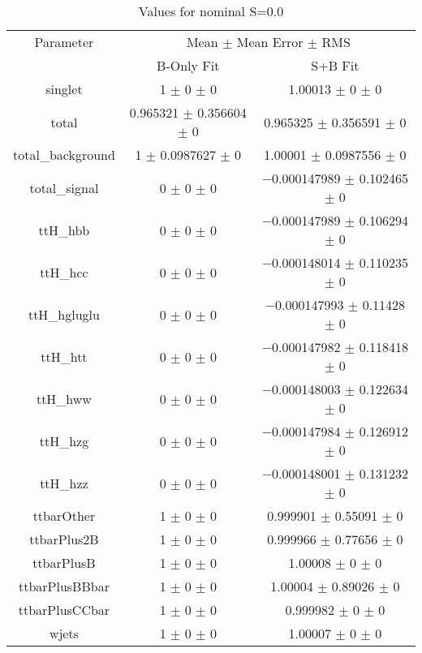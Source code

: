 \begin{table}
\centering
\caption{Values for nominal S=0.0}
\begin{tabular}{ccc}
\toprule
Parameter & \multicolumn{2}{c}{Mean $\pm$ Mean Error $\pm$ RMS}\\
 & B-Only Fit & S+B Fit\\
\midrule
singlet & \num{1} $\pm$ \num{0} $\pm$ \num{0} & \num{1.00013} $\pm$ \num{0} $\pm$ \num{0}\\
total & \num{0.965321} $\pm$ \num{0.356604} $\pm$ \num{0} & \num{0.965325} $\pm$ \num{0.356591} $\pm$ \num{0}\\
total\_background & \num{1} $\pm$ \num{0.0987627} $\pm$ \num{0} & \num{1.00001} $\pm$ \num{0.0987556} $\pm$ \num{0}\\
total\_signal & \num{0} $\pm$ \num{0} $\pm$ \num{0} & \num{-0.000147989} $\pm$ \num{0.102465} $\pm$ \num{0}\\
ttH\_hbb & \num{0} $\pm$ \num{0} $\pm$ \num{0} & \num{-0.000147989} $\pm$ \num{0.106294} $\pm$ \num{0}\\
ttH\_hcc & \num{0} $\pm$ \num{0} $\pm$ \num{0} & \num{-0.000148014} $\pm$ \num{0.110235} $\pm$ \num{0}\\
ttH\_hgluglu & \num{0} $\pm$ \num{0} $\pm$ \num{0} & \num{-0.000147993} $\pm$ \num{0.11428} $\pm$ \num{0}\\
ttH\_htt & \num{0} $\pm$ \num{0} $\pm$ \num{0} & \num{-0.000147982} $\pm$ \num{0.118418} $\pm$ \num{0}\\
ttH\_hww & \num{0} $\pm$ \num{0} $\pm$ \num{0} & \num{-0.000148003} $\pm$ \num{0.122634} $\pm$ \num{0}\\
ttH\_hzg & \num{0} $\pm$ \num{0} $\pm$ \num{0} & \num{-0.000147984} $\pm$ \num{0.126912} $\pm$ \num{0}\\
ttH\_hzz & \num{0} $\pm$ \num{0} $\pm$ \num{0} & \num{-0.000148001} $\pm$ \num{0.131232} $\pm$ \num{0}\\
ttbarOther & \num{1} $\pm$ \num{0} $\pm$ \num{0} & \num{0.999901} $\pm$ \num{0.55091} $\pm$ \num{0}\\
ttbarPlus2B & \num{1} $\pm$ \num{0} $\pm$ \num{0} & \num{0.999966} $\pm$ \num{0.77656} $\pm$ \num{0}\\
ttbarPlusB & \num{1} $\pm$ \num{0} $\pm$ \num{0} & \num{1.00008} $\pm$ \num{0} $\pm$ \num{0}\\
ttbarPlusBBbar & \num{1} $\pm$ \num{0} $\pm$ \num{0} & \num{1.00004} $\pm$ \num{0.89026} $\pm$ \num{0}\\
ttbarPlusCCbar & \num{1} $\pm$ \num{0} $\pm$ \num{0} & \num{0.999982} $\pm$ \num{0} $\pm$ \num{0}\\
wjets & \num{1} $\pm$ \num{0} $\pm$ \num{0} & \num{1.00007} $\pm$ \num{0} $\pm$ \num{0}\\
\bottomrule
\end{tabular}
\end{table}